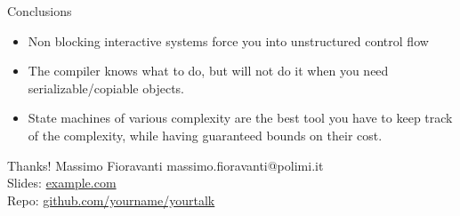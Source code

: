 \documentclass[aspectratio=169,11pt]{beamer}
\begin{document}
\begin{frame}{Conclusions}
    \begin{itemize}
        \item Non blocking interactive systems force you into unstructured control flow
        \item The compiler knows what to do, but will not do it when you need serializable/copiable objects.
        \item State machines of various complexity are the best tool you have to keep track of the complexity, while having guaranteed bounds on their cost.
    \end{itemize}
\end{frame}



\begin{frame}{Thanks!}
  Massimo Fioravanti massimo.fioravanti@polimi.it \\
  Slides: \href{https://example.com}{example.com} \\
  Repo: \href{https://github.com/yourname/yourtalk}{github.com/yourname/yourtalk}
\end{frame}
\end{document}
